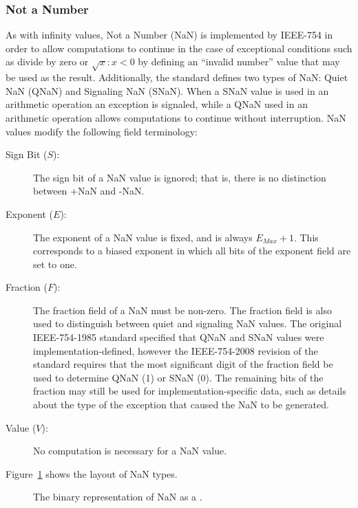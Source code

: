 \subsubsection{Not a Number}
\label{subsubsec:nan}
As with infinity values, Not a Number (NaN) is implemented by IEEE-754 in order to allow computations to continue in the case of exceptional conditions such as divide by zero or $\sqrt{x} : x<0$ by defining an ``invalid number'' value that may be used as the result. Additionally, the standard defines two types of NaN: Quiet NaN (QNaN) and Signaling NaN (SNaN). When a SNaN value is used in an arithmetic operation an exception is signaled, while a QNaN used in an arithmetic operation allows computations to continue without interruption. NaN values modify the following field terminology:

\begin{description}
	\item[Sign Bit ($S$):]
		The sign bit of a NaN value is ignored; that is, there is no distinction between +NaN and -NaN.
	\item[Exponent ($E$):]
		The exponent of a NaN value is fixed, and is always $E_{Max} + 1$. This corresponds to a biased exponent in which all bits of the exponent field are set to one.
	\item[Fraction ($F$):]
		The fraction field of a NaN must be non-zero. The fraction field is also used to distinguish between quiet and signaling NaN values. The original IEEE-754-1985 standard specified that QNaN and SNaN values were implementation-defined, however the IEEE-754-2008 \cite{IEEE-754-2008} revision of the standard requires that the most significant digit of the fraction field be used to determine QNaN (1) or SNaN (0). The remaining bits of the fraction may still be used for implementation-specific data, such as details about the type of the exception that caused the NaN to be generated.
	\item[Value ($V$):]
		No computation is necessary for a NaN value.
\end{description}

Figure~\ref{figure:nan} shows the layout of NaN types.

\begin{figure}
	\centering
  \caption{The binary representation of NaN as a .}
  \label{figure:nan}
\end{figure}

